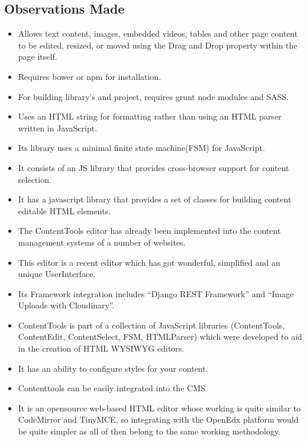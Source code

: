\subsection{Observations Made}
\begin{itemize}
\item Allows text content, images, embedded videos, tables and other page content to be
edited, resized, or moved using the Drag and Drop property within the page itself.
\item Requires bower or npm for installation.
\item For building library’s and project, requires grunt node modules and SASS.
\item Uses an HTML string for formatting rather than using an HTML parser written in
JavaScript.
\item Its library uses a minimal finite state machine(FSM) for JavaScript.
\item It consists of an JS library that provides cross-browser support for content selection.
\item It has a javascript library that provides a set of classes for building content editable
HTML elements.
\item The ContentTools editor has already been implemented into the content management
systems of a number of websites.
\item This editor is a recent editor which has got wonderful, simplified and an unique
UserInterface.
\item Its Framework integration includes “Django REST Framework” and “Image
Uploads with Cloudinary”.
\item ContentTools is part of a collection of JavaScript libraries (ContentTools,
ContentEdit, ContentSelect, FSM, HTMLParser) which were developed to aid in the
creation of HTML WYSIWYG editors.
\item It has an ability to configure styles for your content.
\item Contenttools can be easily integrated into the CMS.
\item It is an opensource web-based HTML editor whose working is quite similar to
CodeMirror and TinyMCE, so integrating with the OpenEdx platform would be
quite simpler as all of then belong to the same working methodology.
\end{itemize}
